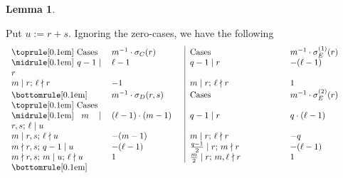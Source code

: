 \documentclass[12pt, reqno]{amsart}
\theoremstyle{definition}
\newtheorem{lemma}[theorem]{Lemma}
\theoremstyle{remark}
\numberwithin{equation}{section}
\begin{document}
\begin{lemma}\label{sum1}
	
	Put $u := r + s$. Ignoring the zero-cases, we have the following
	\[\begin{tabular}{p{3.7cm}p{2.8cm}|p{3.7cm}p{2.8cm}}
		\toprule[0.1em]
		
		Cases & $m^{-1}\cdot\sigma_C(r)$ & Cases & $m^{-1}\cdot\sigma_E^{(1)}(r)$ \\
		
		\midrule[0.1em]
		
		$q - 1 \mid r$ & $\ell - 1$ & $q - 1 \mid r$ & $-(\ell - 1)$ \\
		
		$m \mid r$; $\ell \nmid r$ & $-1$ & $m \mid r$; $\ell \nmid r$ & $1$ \\
		
		\bottomrule[0.1em]
		\toprule[0.1em]
		
		Cases & $m^{-1}\cdot\sigma_D(r, s)$ & Cases & $m^{-1}\cdot\sigma_E^{(2)}(r)$ \\
		
		\midrule[0.1em]
		
		$m \mid r, s$; $\ell \mid u$ & $(\ell - 1)\cdot(m - 1)$ & $q - 1 \mid r$ & $q\cdot(\ell - 1)$ \\
		
		$m \mid r, s$; $\ell \nmid u$ & $-(m - 1)$ & $m \mid r$; $\ell \nmid r$ & $-q$ \\
		
		$m \nmid r, s$; $q - 1 \mid u$ & $-(\ell - 1)$ & $\frac{q - 1}{2} \mid r$; $m \nmid r$ & $-(\ell - 1)$ \\
		
		$m \nmid r, s$; $m \mid u$; $\ell \nmid u$ & $1$ & $\frac{m}{2} \mid r$; $m, \ell \nmid r$ & $1$ \\
		
		\bottomrule[0.1em]
	\end{tabular}\]	
\end{lemma}
\end{document}
